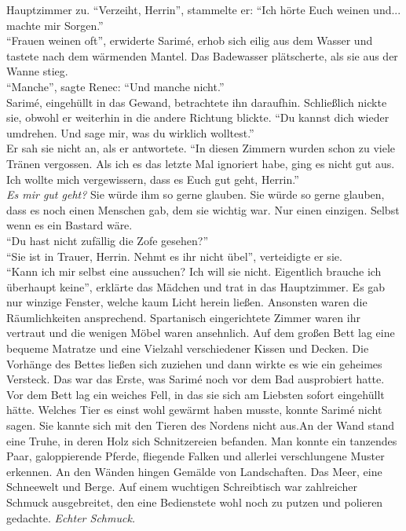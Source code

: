 Hauptzimmer zu. ``Verzeiht, Herrin'', stammelte er: ``Ich hörte Euch weinen und... machte mir 
Sorgen.''\\
``Frauen weinen oft'', erwiderte Sarimé, erhob sich eilig aus dem Wasser und tastete nach dem 
wärmenden Mantel. Das Badewasser plätscherte, als sie aus der Wanne stieg.\\
``Manche'', sagte Renec: ``Und manche nicht.''\\
Sarimé, eingehüllt in das Gewand, betrachtete ihn daraufhin. Schließlich nickte sie, obwohl er 
weiterhin in die andere Richtung blickte. ``Du kannst dich wieder umdrehen. Und sage mir, was du 
wirklich wolltest.''\\
Er sah sie nicht an, als er antwortete. ``In diesen Zimmern wurden schon zu viele Tränen vergossen. 
Als ich es das letzte Mal ignoriert habe, ging es nicht gut aus. Ich wollte mich vergewissern, dass 
es Euch gut geht, Herrin.''\\
\textit{Es mir gut geht?} Sie würde ihm so gerne glauben. Sie würde so gerne glauben, dass es noch 
einen Menschen gab, dem sie wichtig war. Nur einen einzigen. Selbst wenn es ein Bastard wäre.\\
``Du hast nicht zufällig die Zofe gesehen?''\\
``Sie ist in Trauer, Herrin. Nehmt es ihr nicht übel'', verteidigte er sie.\\
``Kann ich mir selbst eine aussuchen? Ich will sie nicht. Eigentlich brauche ich überhaupt keine'', 
erklärte das Mädchen und trat in das Hauptzimmer. Es gab nur winzige Fenster, welche kaum Licht 
herein ließen. Ansonsten waren die Räumlichkeiten ansprechend. Spartanisch eingerichtete Zimmer 
waren ihr vertraut und die wenigen Möbel waren ansehnlich. Auf dem großen Bett lag eine bequeme 
Matratze und eine Vielzahl verschiedener Kissen und Decken. Die Vorhänge des Bettes ließen sich 
zuziehen und dann wirkte es wie ein geheimes Versteck. Das war das Erste, was Sarimé noch vor dem 
Bad ausprobiert hatte. Vor dem Bett lag ein weiches Fell, in das sie sich am Liebsten sofort 
eingehüllt hätte. Welches Tier es einst wohl gewärmt haben musste, konnte Sarimé nicht sagen. Sie 
kannte sich mit den Tieren des Nordens nicht aus.An der Wand stand eine Truhe, in deren Holz  sich 
Schnitzereien befanden. Man konnte ein tanzendes Paar, galoppierende Pferde, fliegende Falken und 
allerlei verschlungene Muster erkennen. An den Wänden hingen Gemälde von Landschaften. Das Meer, 
eine Schneewelt und Berge. Auf einem wuchtigen Schreibtisch war zahlreicher Schmuck ausgebreitet, 
den eine Bedienstete wohl noch zu putzen und polieren gedachte. \textit{Echter Schmuck.}\\

